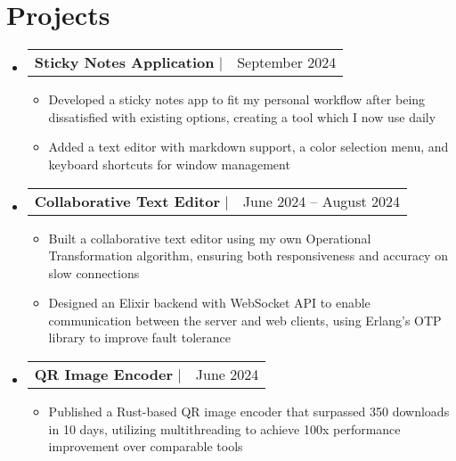 \documentclass[letterpaper,11pt]{article}
\makeatletter
\newcommand{\resumeItem}[1]{
  \item\small{
    {#1 \vspace{-2pt}}
  }
}
\newcommand{\resumeProjectHeading}[2]{
    \item
    \begin{tabular*}{0.97\textwidth}{l@{\extracolsep{\fill}}r}
      \small#1 & #2 \\
    \end{tabular*}\vspace{-7pt}
}
\newcommand{\resumeSubHeadingListStart}{\begin{itemize}[leftmargin=0.15in, label={}]}
\newcommand{\resumeSubHeadingListEnd}{\end{itemize}}
\newcommand{\resumeItemListStart}{\begin{itemize}}
\newcommand{\resumeItemListEnd}{\end{itemize}\vspace{-5pt}}
\makeatother
\begin{document}
\section{Projects}
    \resumeSubHeadingListStart
      \resumeProjectHeading{\textbf{Sticky Notes Application} $|$ \href{https://github.com/andrewyur/md-sticky}{\underline{\smash{https://github.com/andrewyur/md-sticky}}}}{September 2024}
      \resumeItemListStart
        \resumeItem{Developed a sticky notes app to fit my personal workflow after being dissatisfied with existing options, creating a tool which I now use daily}
        \resumeItem{Added a text editor with markdown support, a color selection menu, and keyboard shortcuts for window management}
      \resumeItemListEnd
      \resumeProjectHeading{\textbf{Collaborative Text Editor} $|$ \href{https://collab-notepad.baetylboy.biz}{\underline{\smash{https://collab-notepad.baetylboy.biz}}}}{
        June 2024 -- August 2024}
      \resumeItemListStart
        \resumeItem{Built a collaborative text editor using my own Operational Transformation algorithm, ensuring both responsiveness and accuracy on slow connections}
        \resumeItem{Designed an Elixir backend with WebSocket API to enable communication between the server and web clients, using Erlang’s OTP library to improve fault tolerance}
      \resumeItemListEnd
      \resumeProjectHeading{\textbf{QR Image Encoder} $|$ \href{https://crates.io/crates/qart
      }{\underline{\smash{https://crates.io/crates/qart}
      }}}{June 2024}
      \resumeItemListStart
        \resumeItem{Published a Rust-based QR image encoder that surpassed 350 downloads in 10 days, utilizing multithreading to achieve 100x performance improvement over comparable tools}
      \resumeItemListEnd
    \resumeSubHeadingListEnd





\end{document}
